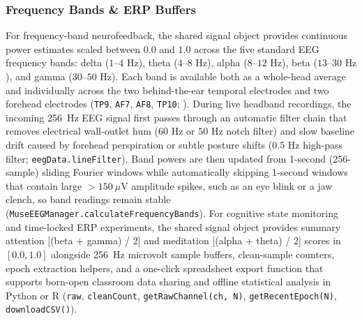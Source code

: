 \documentclass[11pt]{article}
\begin{document}
\subsubsection{Frequency Bands \& ERP Buffers}
For frequency-band neurofeedback, the shared signal object provides continuous power estimates scaled between $0.0$ and $1.0$ across the five standard EEG frequency bands: delta ($1\text{--}4\text{ Hz}$), theta ($4\text{--}8\text{ Hz}$), alpha ($8\text{--}12\text{ Hz}$), beta ($13\text{--}30\text{ Hz}$), and gamma ($30\text{--}50\text{ Hz}$). Each band is available both as a whole-head average and individually across the two behind-the-ear temporal electrodes and two forehead electrodes (\texttt{TP9}, \texttt{AF7}, \texttt{AF8}, \texttt{TP10}; \citealp{cannard2021validating,sabio2024scoping}). During live headband recordings, the incoming 256~Hz EEG signal first passes through an automatic filter chain that removes electrical wall-outlet hum ($60\text{ Hz}$ or $50\text{ Hz}$ notch filter) and slow baseline drift caused by forehead perspiration or subtle posture shifts ($0.5\text{ Hz}$ high-pass filter; \texttt{eegData.lineFilter}). Band powers are then updated from 1-second (256-sample) sliding Fourier windows while automatically skipping 1-second windows that contain large $>150\ \mu\text{V}$ amplitude spikes, such as an eye blink or a jaw clench, so band readings remain stable (\texttt{MuseEEGManager.calculateFrequencyBands}). For cognitive state monitoring and time-locked ERP experiments, the shared signal object provides summary attention [(beta + gamma) / 2] and meditation [(alpha + theta) / 2] scores in $[0.0, 1.0]$ alongside 256~Hz microvolt sample buffers, clean-sample counters, epoch extraction helpers, and a one-click spreadsheet export function that supports born-open classroom data sharing and offline statistical analysis in Python or R \citep{deleeuw2024datapipe,makowski2021neurokit2,cannard2024brainbeats} (\texttt{raw}, \texttt{cleanCount}, \texttt{getRawChannel(ch, N)}, \texttt{getRecentEpoch(N)}, \texttt{downloadCSV()}).
\end{document}
